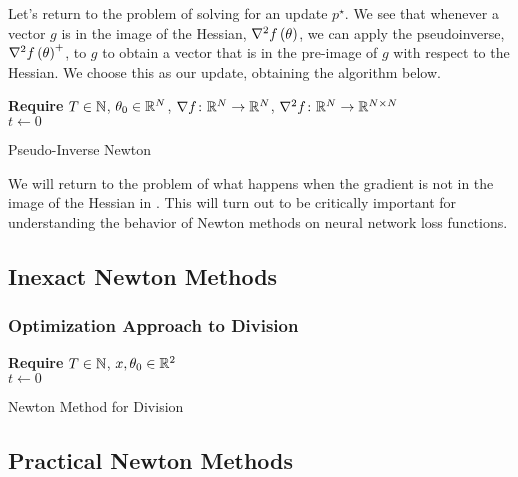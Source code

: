 \documentclass[../../thesis.tex]{subfiles}
\begin{document}
Let's return to the problem of solving
for an update $p^{\star}$.
We see that whenever a vector $g$
is in the image of the Hessian, $\nabla^2f\left(\theta\right)$,
we can apply the pseudoinverse, $\nabla^2f\left(\theta\right)^{+}$,
to $g$ to obtain a vector that is in the pre-image of $g$
with respect to the Hessian.
We choose this as our update,
obtaining the algorithm below.

\begin{algorithm}[H]
    \SetAlgoLined{}
    \textbf{Require}
    $T\in \mathbb{N}$, $\theta_0 \in \mathbb{R}^N$,
    $\nabla{f}\colon\mathbb{R}^N\to\mathbb{R}^N$,
    $\nabla^2{f}\colon\mathbb{R}^N\to\mathbb{R}^{N\times N}$\\
    $t \leftarrow 0$\\
    \caption{Pseudo-Inverse Newton}
\end{algorithm}

We will return to the problem of what happens
when the gradient is not in the image of the Hessian in .
This will turn out to be critically important for understanding
the behavior of Newton methods on neural network loss functions.

\subsection{Inexact Newton Methods}

\subsubsection{Optimization Approach to Division}

\begin{algorithm}[H]
    \SetAlgoLined{}
    \textbf{Require}
    $T\in \mathbb{N}$, $x, \theta_0 \in \mathbb{R}^2$\ \\
    $t \leftarrow 0$\\
    \caption{Newton Method for Division}
\end{algorithm}

\subsection{Practical Newton Methods}
\end{document}
